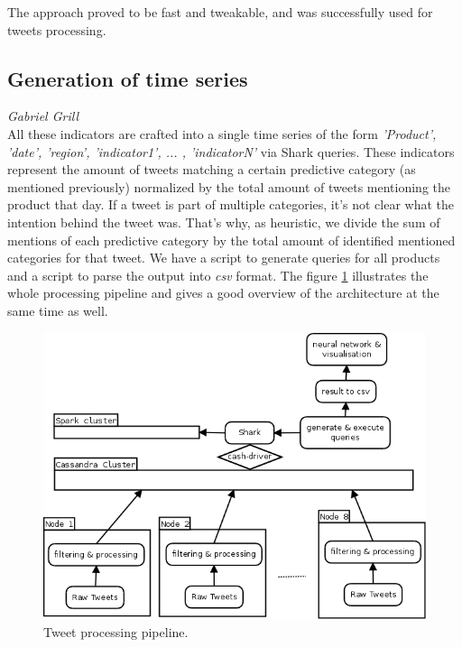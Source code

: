 The approach proved to be fast and tweakable, and was successfully used for tweets processing.

\subsection*{Generation of time series}
\emph{Gabriel Grill} \\
All these indicators are crafted into a single time series of the form \emph{'Product', 'date', 'region', 'indicator1', ... , 'indicatorN'} via Shark queries. These indicators represent the amount of tweets matching a certain predictive category (as mentioned previously) normalized by the total amount of tweets mentioning the product that day. If a tweet is part of multiple categories, it's not clear what the intention behind the tweet was. That's why, as heuristic, we divide the sum of mentions of each predictive category by the total amount of identified mentioned categories for that tweet. We have a script to generate queries for all products and a script to parse the output into \emph{csv} format. The figure \ref{fig:architecture} illustrates the whole processing pipeline and gives a good overview of the architecture at the same time as well.

\begin{figure}
\includegraphics[width=.7\textwidth]{./img/architecture.png}
\caption{Tweet processing pipeline.}
\label{fig:architecture}
\end{figure}

